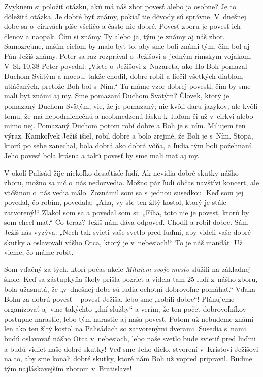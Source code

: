 


Zvyknem si položiť otázku, akú má náš zbor povesť alebo ja osobne? Je to dôležitá otázka. Je dobré byť známy, pokiaľ tie dôvody sú správne. V~dnešnej dobe sa o~cirkvách píše všeličo a často nie dobré. Povesť zboru je povesť ich členov a naopak. Čím si známy Ty alebo ja, tým je známy aj náš zbor. Samozrejme, naším cieľom by malo byť to, aby sme boli známi tým, čím bol aj Pán Ježiš známy. Peter sa raz rozprával o~Ježišovi s~jedným rímskym vojakom. V~Sk 10,38 Peter povedal: „Viete o~Ježišovi z~Nazareta, ako Ho Boh pomazal Duchom Svätým a mocou, takže chodil, dobre robil a liečil všetkých diablom utláčaných, pretože Boh bol s~Ním.“ Tu máme vzor dobrej povesti, čím by sme mali byť známi aj my. Sme pomazaní Duchom Svätým? Človek, ktorý je pomazaný Duchom Svätým, vie, že je pomazaný; nie kvôli daru jazykov, ale kvôli tomu, že má nepodmienečnú a neobmedzenú lásku k~ľuďom či už v~cirkvi alebo mimo nej. Pomazaný Duchom potom robí dobre a Boh je s~ním. Milujem ten výraz. Kamkoľvek Ježiš išiel, robil dobre a bolo zrejmé, že Boh je s~Ním. Stopa, ktorú po sebe zanechal, bola dobrá ako dobrá vôňa, a ľudia tým boli požehnaní. Jeho povesť bola krásna a takú povesť by sme mali mať aj my.

V okolí Palisád žije niekoľko desaťtisíc ľudí. Ak nevidia dobré skutky nášho zboru, možno sa nič o~nás nedozvedia. Možno pár ľudí občas navštívi koncert, ale väčšinou o~nás vedia málo. Zoznámil som sa s~jednou susedkou. Keď som jej povedal, čo robím, povedala: „Aha, vy ste ten žltý kostol, ktorý je stále zatvorený!“ Zľakol som sa a povedal som si: „Fíha, toto nie je povesť, ktorú by som chcel mať.“ Čo teraz? Ježiš nám dáva odpoveď. Chodil a robil dobre. Sám Ježiš nás vyzýva: „Nech tak svieti vaše svetlo pred ľuďmi, aby videli vaše dobré skutky a oslavovali vášho Otca, ktorý je v~nebesiach!“ To je náš mandát. Už vieme, čo máme robiť.

Som vďačný za tých, ktorí počas akcie {\it Milujem svoje mesto} slúžili na základnej škole. Keď sa zástupkyňa školy prišla pozrieť a videla tam 25 ľudí z~nášho zboru, bola užasnutá, že „v~dnešnej dobe sú ľudia ochotní dobrovoľne pomáhať.“ Vďaka Bohu za dobrú povesť -- povesť Ježiša, lebo sme „robili dobre“! Plánujeme organizovať aj viac takýchto „dní služby“ a verím, že ten počet dobrovoľníkov postupne narastie, lebo tým narastie aj naša povesť. Potom už nebudeme známi len ako ten žltý kostol na Palisádach so zatvorenými dverami. Susedia s~nami budú oslavovať nášho Otca v~nebesiach, lebo naše svetlo bude svietiť pred ľuďmi a budú vidieť naše dobré skutky! Veď sme Jeho dielo, stvorení v~Kristovi Ježišovi na to, aby sme konali dobré skutky, ktoré nám Boh už vopred pripravil. Buďme tým najláskavejším zborom v~Bratislave!

